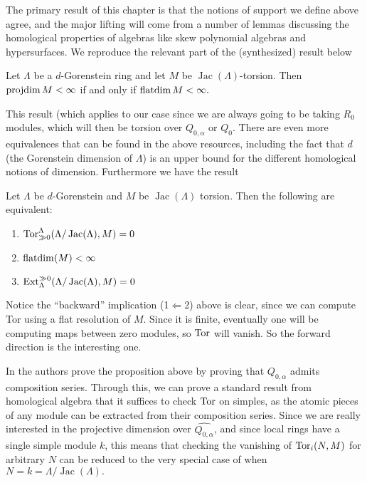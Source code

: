 \documentclass [11pt, proquest] {uwthesis}[2020/02/24]
\begin{document}
    The primary result of this chapter is that the notions of support we define above agree, and the major lifting will come from a number of lemmas discussing the homological properties of algebras like skew polynomial algebras and hypersurfaces. We reproduce the relevant part of the (synthesized) result below
    
    \begin{prop}\label{prop:homological-dims}
        Let $\Lambda$ be a $d$-Gorenstein ring and let $M$ be $\operatorname{Jac}(\Lambda)$-torsion. Then $\operatorname{projdim} M<\infty$ if and only if $\operatorname{flatdim} M<\infty.$
    \end{prop}
    This result (which applies to our case since we are always going to be taking $R_0$ modules, which will then be torsion over $Q_{0,\alpha}$ or $Q_0$. There are even more equivalences that can be found in the above resources, including the fact that $d$ (the Gorenstein dimension of $\Lambda$) is an upper bound for the different homological notions of dimension. Furthermore we have the result
    \begin{prop}\label{prop:flat-torsion-equiv}
        Let $\Lambda$ be $d$-Gorenstein and $M$ be $\operatorname{Jac}(\Lambda)$ torsion. Then the following are equivalent:
        \begin{enumerate}
            \item $\operatorname{Tor}_{\gg0}^\Lambda(\Lambda/\operatorname{Jac}(\Lambda),M)=0$
            \item $\operatorname{flatdim}(M)<\infty$
            \item $\operatorname{Ext}^{\gg0}_\Lambda(\Lambda/\operatorname{Jac}(\Lambda),M)=0$
        \end{enumerate}
    \end{prop}
    \begin{rmk}
        Notice the ``backward'' implication (1$\Leftarrow$2) above is clear, since we can compute Tor using a flat resolution of $M$. Since it is finite, eventually one will be computing maps between zero modules, so $\operatorname{Tor}$ will vanish. So the forward direction is the interesting one. 
        
        In \cite[sec. 3.1]{negron-pevtsovaII} the authors prove the proposition above by proving that $Q_{0,\alpha}$ admits composition series. Through this, we can prove a standard result from homological algebra that it suffices to check $\operatorname{Tor}$ on simples, as the atomic pieces of any module can be extracted from their composition series. Since we are really interested in the projective dimension over $\widehat{Q_{0,\alpha}}$, and since local rings have a single simple module $k$, this means that checking the vanishing of $\operatorname{Tor}_i(N,M)$ for arbitrary $N$ can be reduced to the very special case of when $N=k=\Lambda/\operatorname{Jac}(\Lambda).$
    \end{rmk}
    
\end{document}

